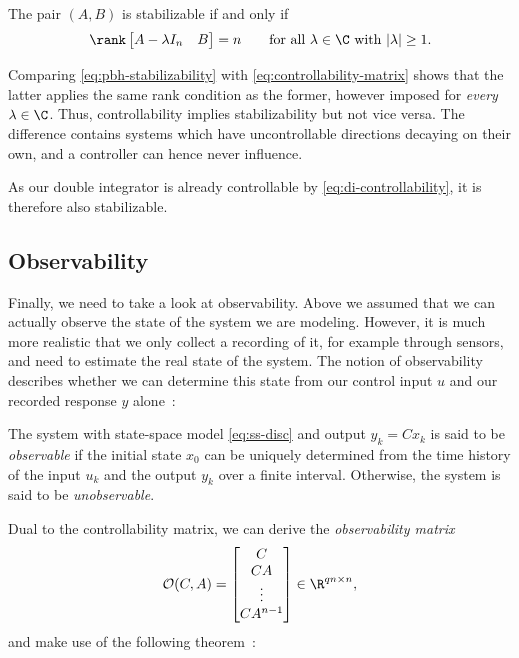 \begin{theorem}
\label{thm:pbh-stabilizability}
The pair $(A, B)$ is stabilizable if and only if
\begin{equation}
    \label{eq:pbh-stabilizability}
    \rank \begin{bmatrix} A - \lambda I_n & B \end{bmatrix} = n
    \qquad \text{for all } \lambda \in \C \text{ with } \lvert \lambda \rvert \ge 1 .
\end{equation}
\end{theorem}

Comparing \eqref{eq:pbh-stabilizability} with
\eqref{eq:controllability-matrix} shows that the latter
applies the same rank condition as the former, however 
imposed for \emph{every} $\lambda \in \C$. 
Thus, controllability implies stabilizability but not vice versa. 
The difference contains systems which have uncontrollable
directions decaying on their own, and a controller can hence never
influence.

As our double integrator is already controllable by \eqref{eq:di-controllability},
it is therefore also stabilizable.

\subsection{Observability}
\label{subsec:observability}

Finally, we need to take a look at observability. Above we assumed that we can
actually observe the state of the system we are modeling. However, it is much
more realistic that we only collect a recording of it, for example through
sensors, and need to estimate the real state of the
system. The notion of observability describes whether we can determine this
state from our control input $u$ and our recorded response $y$ alone~:

\begin{definition}[Observability]
\label{def:observability}
The system with state-space model \eqref{eq:ss-disc} and output $y_k = C x_k$
is said to be \emph{observable} if the initial state $x_0$ can be uniquely
determined from the time history of the input $u_k$ and the output $y_k$ over a
finite interval. Otherwise, the system is said to be \emph{unobservable}.
\end{definition}

Dual to the controllability matrix, we can derive the \emph{observability
matrix}
\begin{equation}
    \label{eq:observability-matrix}
    \mathcal{O}(C, A) =
    \begin{bmatrix} C \\ CA \\ \vdots \\ CA^{n-1} \end{bmatrix}
    \in \R^{qn \times n},
\end{equation}
and make use of the following theorem~:

